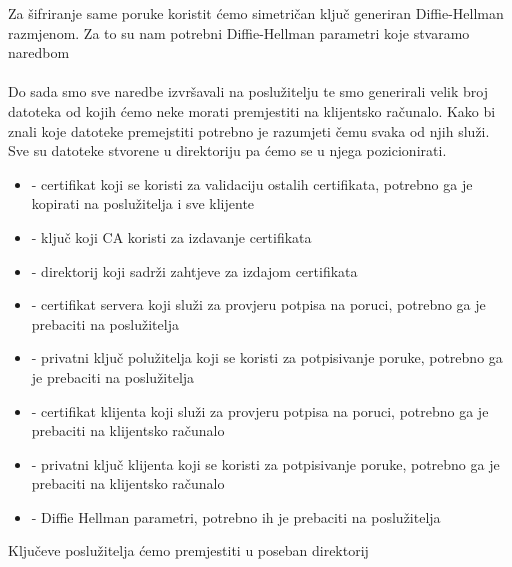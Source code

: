         \noindent
        Za šifriranje same poruke koristit ćemo simetričan ključ generiran
        Diffie-Hellman razmjenom. Za to su nam potrebni Diffie-Hellman
        parametri koje stvaramo naredbom \\

        \noindent
         \\

        \noindent
        Do sada smo sve naredbe izvršavali na poslužitelju te smo generirali
        velik broj datoteka od kojih ćemo neke morati premjestiti na klijentsko
        računalo. Kako bi znali koje datoteke premejstiti potrebno je razumjeti
        čemu svaka od njih služi. Sve su datoteke stvorene u
        direktoriju pa ćemo se u njega pozicionirati. \\

        \begin{itemize}
        \item {} - certifikat koji se koristi za validaciju ostalih
        certifikata, potrebno ga je kopirati na poslužitelja i sve klijente
        \item {} - ključ koji CA koristi za izdavanje certifikata
        \item {} - direktorij koji sadrži zahtjeve za izdajom
        certifikata 
        \item {} - certifikat servera koji služi za
        provjeru potpisa na poruci, potrebno ga je prebaciti na poslužitelja
        \item {} - privatni ključ polužitelja
        koji se koristi za potpisivanje poruke, potrebno ga je prebaciti na
        poslužitelja
        \item {} - certifikat klijenta koji služi za
        provjeru potpisa na poruci, potrebno ga je prebaciti na klijentsko
        računalo
        \item {} - privatni ključ klijenta
        koji se koristi za potpisivanje poruke, potrebno ga je prebaciti na
        klijentsko računalo
        \item {} - Diffie Hellman parametri, potrebno ih je prebaciti na
        poslužitelja
        \end{itemize}

        \noindent
        Ključeve poslužitelja ćemo premjestiti u poseban direktorij \\

